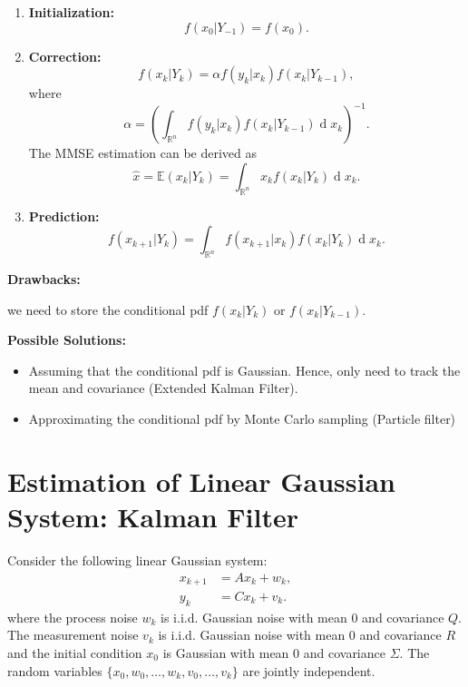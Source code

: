 \documentclass{article}
\DeclareMathOperator{\der}{d}
\begin{document}
\begin{enumerate}
  \item {\bf Initialization:}
    \begin{displaymath}
      f(x_0|Y_{-1}) = f(x_0).
    \end{displaymath}
  \item {\bf Correction:}
    \begin{displaymath}
      f(x_k|Y_k) = \alpha f(y_k|x_k)f(x_k|Y_{k-1}),
    \end{displaymath}
    where
    \begin{displaymath}
      \alpha = \left(\int_{\mathbb R^n} f(y_k|x_k)f(x_k|Y_{k-1})\der x_k \right)^{-1}. 
    \end{displaymath}
    The MMSE estimation can be derived as
    \begin{displaymath}
      \hat x = \mathbb E(x_k|Y_k) = \int_{\mathbb R^n}x_kf(x_k|Y_k)\der x_k. 
    \end{displaymath}
  \item {\bf Prediction:}
    \begin{displaymath}
      f(x_{k+1}|Y_k) = \int_{\mathbb R^n} f(x_{k+1}|x_k)f(x_k|Y_k)\der x_k. 
    \end{displaymath}
\end{enumerate}

{\bf Drawbacks:}

we need to store the conditional pdf $f(x_k|Y_k)$ or $f(x_k|Y_{k-1})$.

{\bf Possible Solutions:}
\begin{itemize}
  \item Assuming that the conditional pdf is Gaussian. Hence, only need to track the mean and covariance (Extended Kalman Filter). 
  \item Approximating the conditional pdf by Monte Carlo sampling (Particle filter) 
\end{itemize}
\section{Estimation of Linear Gaussian System: Kalman Filter}
Consider the following linear Gaussian system:
\begin{align*}
  x_{k+1} &= A x_k + w_k,\\
y_k &= Cx_k + v_k.
\end{align*}
where the process noise $w_k$ is i.i.d. Gaussian noise with mean 0 and covariance $Q$. The measurement noise $v_k$ is i.i.d. Gaussian noise with mean 0 and covariance $R$ and the initial condition $x_0$ is Gaussian with mean 0 and covariance $\Sigma$. The random variables $\{x_0,w_0,\dots,w_k,v_0,\dots,v_k\}$ are jointly independent.
\end{document}

